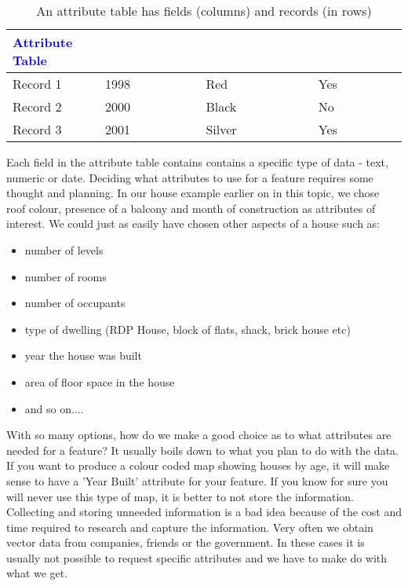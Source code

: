 \begin{table}[ht]
\centering
\caption{An attribute table has fields (columns) and records (in rows)}\medskip
 \label{tab:attributes}
 \begin{tabular}{|p{4cm}|p{4cm}|p{4cm}|p{4cm}|}
 \hline
 \rowcolor{black}
 \textcolor{blue}{\textbf{Attribute Table}} &
 \textcolor{white}{\textbf{Field 1: YearBuilt}} & 
 \textcolor{white}{\textbf{Field 2: RoofColour}} &
 \textcolor{white}{\textbf{Field 3: Balcony}} \\
 \hline Record 1 & 1998 & Red & Yes \\
 \hline Record 2 & 2000 & Black & No \\
 \hline Record 3 & 2001 & Silver & Yes\\
\hline
\end{tabular}
\end{table}

Each field in the attribute table contains contains a specific type of data -
text, numeric or date. Deciding what attributes to use for a feature requires
some thought and planning. In our house example earlier on in this topic, we
chose roof colour, presence of a balcony and month of construction as
attributes of interest. We could just as easily have chosen other aspects of
a house such as:

\begin{itemize}
\item number of levels
\item number of rooms
\item number of occupants
\item type of dwelling (RDP House, block of flats, shack, brick house etc)
\item year the house was built
\item area of floor space in the house
\item and so on....
\end{itemize}

With so many options, how do we make a good choice as to what attributes are
needed for a feature? It usually boils down to what you plan to do with the
data. If you want to produce a colour coded map showing houses by age, it
will make sense to have a 'Year Built' attribute for your feature. If you
know for sure you will never use this type of map, it is better to not store
the information. Collecting and storing unneeded information is a bad idea
because of the cost and time required to research and capture the
information. Very often we obtain vector data from companies, friends or the
government. In these cases it is usually not possible to request specific
attributes and we have to make do with what we get.

